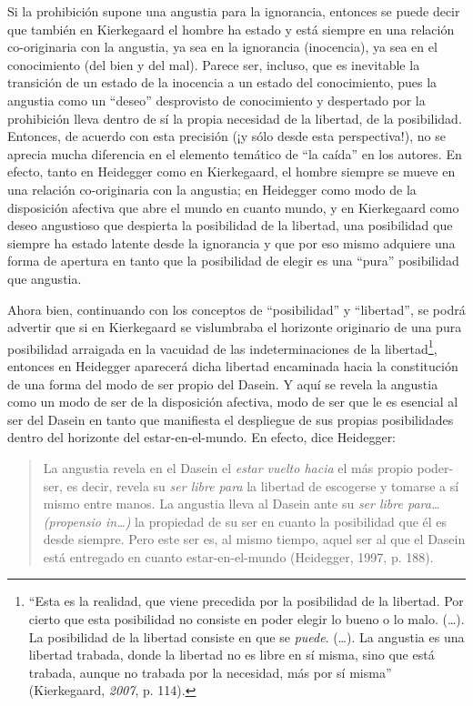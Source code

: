 \documentclass[]{article}
\begin{document}
Si la prohibición supone una angustia para la ignorancia, entonces se puede decir que también en Kierkegaard el hombre ha estado y está siempre en una relación co-originaria con la angustia, ya sea en la ignorancia (inocencia), ya sea en el conocimiento (del bien y del mal). Parece ser, incluso, que es inevitable la transición de un estado de la inocencia a un estado del conocimiento, pues la angustia como un ``deseo'' desprovisto de conocimiento y despertado por la prohibición lleva dentro de sí la propia necesidad de la libertad, de la posibilidad. Entonces, de acuerdo con esta precisión (¡y sólo desde esta perspectiva!), no se aprecia mucha diferencia en el elemento temático de ``la caída'' en los autores. En efecto, tanto en Heidegger como en Kierkegaard, el hombre siempre se mueve en una relación co-originaria con la angustia; en Heidegger como modo de la disposición afectiva que abre el mundo en cuanto mundo, y en Kierkegaard como deseo angustioso que despierta la posibilidad de la libertad, una posibilidad que siempre ha estado latente desde la ignorancia y que por eso mismo adquiere una forma de apertura en tanto que la posibilidad de elegir es una ``pura'' posibilidad que angustia.

Ahora bien, continuando con los conceptos de ``posibilidad'' y ``libertad'', se podrá advertir que si en Kierkegaard se vislumbraba el horizonte originario de una pura posibilidad arraigada en la vacuidad de las indeterminaciones de la libertad\footnote{``Esta es la realidad, que viene precedida por la posibilidad de la libertad. Por cierto que esta posibilidad no consiste en poder elegir lo bueno o lo malo. (\ldots{}). La posibilidad de la libertad consiste en que se \emph{puede}. (\ldots{}). La angustia es una libertad trabada, donde la libertad no es libre en sí misma, sino que está trabada, aunque no trabada por la necesidad, más por sí misma'' (Kierkegaard, \emph{2007}, p. 114).}, entonces en Heidegger aparecerá dicha libertad encaminada hacia la constitución de una forma del modo de ser propio del Dasein. Y aquí se revela la angustia como un modo de ser de la disposición afectiva, modo de ser que le es esencial al ser del Dasein en tanto que manifiesta el despliegue de sus propias posibilidades dentro del horizonte del estar-en-el-mundo. En efecto, dice Heidegger:

\begin{quote}
La angustia revela en el Dasein el \emph{estar vuelto hacia} el más propio poder-ser, es decir, revela su \emph{ser libre para} la libertad de escogerse y tomarse a sí mismo entre manos. La angustia lleva al Dasein ante su \emph{ser libre para\ldots{} (propensio in\ldots{})} la propiedad de su ser en cuanto la posibilidad que él es desde siempre. Pero este ser es, al mismo tiempo, aquel ser al que el Dasein está entregado en cuanto estar-en-el-mundo (Heidegger, 1997, p. 188).
\end{quote}
\end{document}
